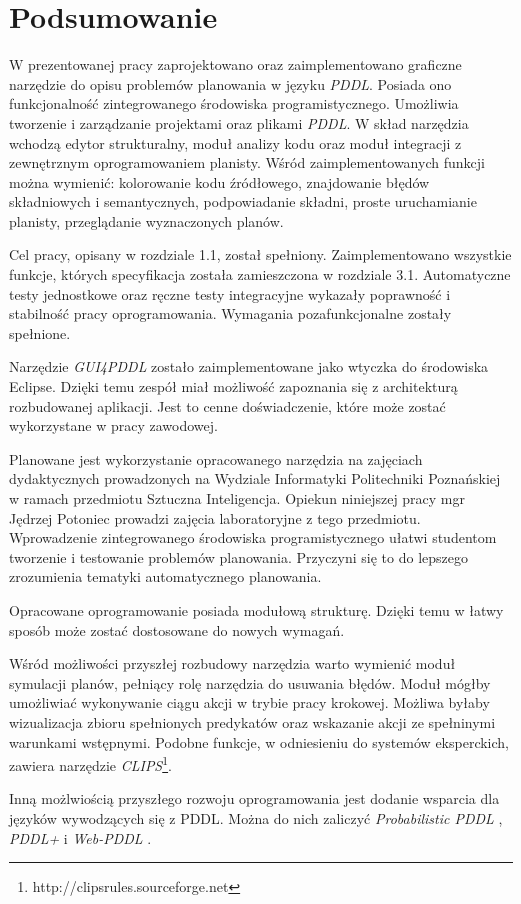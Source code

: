 \chapter{Podsumowanie}

W prezentowanej pracy zaprojektowano oraz zaimplementowano graficzne narzędzie do opisu problemów planowania
w języku \emph{PDDL}.
Posiada ono funkcjonalność zintegrowanego środowiska programistycznego. Umożliwia tworzenie i zarządzanie
projektami oraz plikami \emph{PDDL}. W skład narzędzia wchodzą edytor strukturalny, moduł analizy kodu oraz moduł
integracji z zewnętrznym oprogramowaniem planisty. Wśród zaimplementowanych funkcji można wymienić: kolorowanie kodu źródłowego, znajdowanie błędów składniowych i semantycznych,
podpowiadanie składni, proste uruchamianie planisty, przeglądanie wyznaczonych planów.

Cel pracy, opisany w rozdziale 1.1, został spełniony. Zaimplementowano wszystkie funkcje, których specyfikacja
została zamieszczona w rozdziale 3.1. Automatyczne testy jednostkowe oraz ręczne testy integracyjne wykazały
poprawność i stabilność pracy oprogramowania. Wymagania pozafunkcjonalne zostały spełnione.

Narzędzie \emph{GUI4PDDL} zostało zaimplementowane jako wtyczka do środowiska Eclipse. Dzięki temu 
zespół miał możliwość zapoznania się z architekturą rozbudowanej aplikacji. Jest to cenne doświadczenie,
które może zostać wykorzystane w pracy zawodowej.

Planowane jest wykorzystanie opracowanego narzędzia na zajęciach dydaktycznych prowadzonych na Wydziale 
Informatyki Politechniki Poznańskiej w ramach przedmiotu Sztuczna Inteligencja. Opiekun niniejszej pracy mgr Jędrzej
Potoniec prowadzi zajęcia laboratoryjne z tego przedmiotu. Wprowadzenie zintegrowanego środowiska programistycznego
ułatwi studentom tworzenie i testowanie problemów planowania. Przyczyni się to do lepszego zrozumienia tematyki
automatycznego planowania.

Opracowane oprogramowanie posiada modułową strukturę. Dzięki temu w łatwy sposób może zostać dostosowane do 
nowych wymagań.

Wśród możliwości przyszłej rozbudowy narzędzia warto wymienić moduł symulacji planów, pełniący rolę narzędzia
do usuwania błędów. Moduł mógłby umożliwiać wykonywanie ciągu akcji w trybie pracy krokowej.
Możliwa byłaby wizualizacja zbioru spełnionych predykatów oraz wskazanie akcji ze spełninymi warunkami wstępnymi.
Podobne funkcje, w odniesieniu do systemów eksperckich, zawiera narzędzie \emph{CLIPS}\footnote{http://clipsrules.sourceforge.net}.

Inną możlwiością przyszłego rozwoju oprogramowania jest dodanie wsparcia dla języków wywodzących się z PDDL.
Można do nich zaliczyć \emph{Probabilistic PDDL} \cite{ppddl}, \emph{PDDL+} \cite{pddlplus} i \emph{Web-PDDL}
\cite{webpddl}. 

